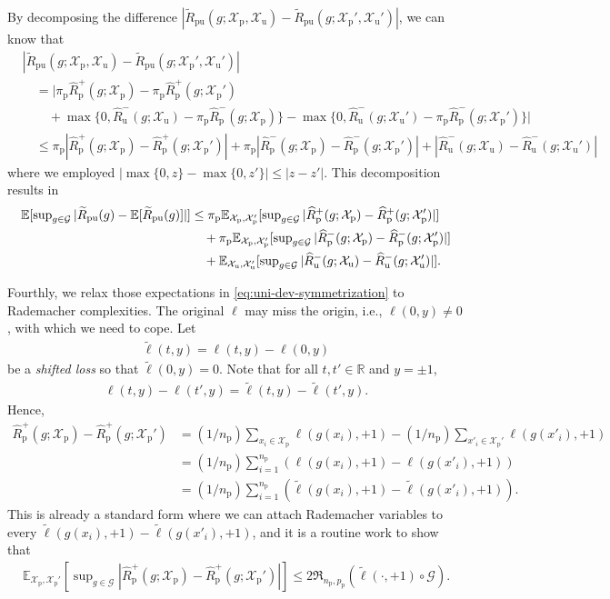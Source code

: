 \documentclass[12pt]{article}
\newcommand{\bE}{\mathbb{E}}
\newcommand{\bR}{\mathbb{R}}
\newcommand{\cG}{\mathcal{G}}
\newcommand{\cX}{\mathcal{X}}
\newcommand{\fR}{\mathfrak{R}}
\newcommand{\prp}{p_\mathrm{p}}
\newcommand{\pip}{\pi_\mathrm{p}}
\newcommand{\Xp}{\cX_\mathrm{p}}
\newcommand{\Xu}{\cX_\mathrm{u}}
\newcommand{\Np}{{n_\mathrm{p}}}
\newcommand{\hRp}{\widehat{R}_\mathrm{p}}
\newcommand{\hRu}{\widehat{R}_\mathrm{u}}
\newcommand{\tRpu}{\widetilde{R}_\mathrm{pu}}
\theoremstyle{definition}
\begin{document}
By decomposing the difference $|\tRpu(g;\Xp,\Xu)-\tRpu(g;\Xp',\Xu')|$, we can know that
\begin{align*}
&|\tRpu(g;\Xp,\Xu)-\tRpu(g;\Xp',\Xu')|\\
&\quad = |\pip\hRp^+(g;\Xp)-\pip\hRp^+(g;\Xp')\\
&\qquad +\max\{0,\hRu^-(g;\Xu)-\pip\hRp^-(g;\Xp)\}
-\max\{0,\hRu^-(g;\Xu')-\pip\hRp^-(g;\Xp')\}|\\
&\quad \le \pip|\hRp^+(g;\Xp)-\hRp^+(g;\Xp')|
+\pip|\hRp^-(g;\Xp)-\hRp^-(g;\Xp')|
+|\hRu^-(g;\Xu)-\hRu^-(g;\Xu')|
\end{align*}
where we employed $|\max\{0,z\}-\max\{0,z'\}|\le|z-z'|$. This decomposition results in
\begin{align}
\bE[\sup\nolimits_{g\in\cG}|\tRpu(g)-\bE[\tRpu(g)]|]
&\le \pip\bE_{\Xp,\Xp'}[\sup\nolimits_{g\in\cG}|\hRp^+(g;\Xp)-\hRp^+(g;\Xp')|] \notag\\
&\quad +\pip\bE_{\Xp,\Xp'}[\sup\nolimits_{g\in\cG}|\hRp^-(g;\Xp)-\hRp^-(g;\Xp')|] \notag\\
\label{eq:uni-dev-symmetrization}%
&\quad +\bE_{\Xu,\Xu'}[\sup\nolimits_{g\in\cG}|\hRu^-(g;\Xu)-\hRu^-(g;\Xu')|].
\end{align}

Fourthly, we relax those expectations in \eqref{eq:uni-dev-symmetrization} to Rademacher complexities. The original $\ell$ may miss the origin, i.e., $\ell(0,y)\neq0$, with which we need to cope. Let
\begin{align*}
\tilde{\ell}(t,y)=\ell(t,y)-\ell(0,y)
\end{align*}
be a \emph{shifted loss} so that $\tilde{\ell}(0,y)=0$. Note that for all $t,t'\in\bR$ and $y=\pm1$, 
\begin{align*}
\ell(t,y)-\ell(t',y)=\tilde{\ell}(t,y)-\tilde{\ell}(t',y).
\end{align*}
Hence,
\begin{align*}
\hRp^+(g;\Xp)-\hRp^+(g;\Xp')
&\textstyle = (1/\Np)\sum_{x_i\in\Xp}\ell(g(x_i),+1)
-(1/\Np)\sum_{x'_i\in\Xp'}\ell(g(x'_i),+1)\\
&\textstyle = (1/\Np)\sum_{i=1}^\Np(\ell(g(x_i),+1)-\ell(g(x'_i),+1))\\
&\textstyle = (1/\Np)\sum_{i=1}^\Np
(\tilde{\ell}(g(x_i),+1)-\tilde{\ell}(g(x'_i),+1)).
\end{align*}
This is already a standard form where we can attach Rademacher variables to every $\tilde{\ell}(g(x_i),+1)-\tilde{\ell}(g(x'_i),+1)$, and it is a routine work to show that
\begin{align*}
\bE_{\Xp,\Xp'}[\sup\nolimits_{g\in\cG}|\hRp^+(g;\Xp)-\hRp^+(g;\Xp')|]
\le 2\fR_{\Np,\prp}(\tilde{\ell}(\cdot,+1)\circ\cG).
\end{align*}
\end{document}
